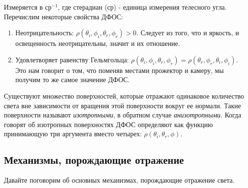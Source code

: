 Измеряется в ср$^{-1}$, где стерадиан (ср) - единица измерения телесного угла. Перечислим некоторые свойства ДФОС:
\begin{enumerate}
  \item Неотрицательность: $\rho(\theta_i,\phi_i,\theta_r,\phi_r)>0$. Следует из того, что и
        яркость, и освещенность неотрицательны, значит и их отношение.
  \item Удовлетворяет равенству Гельмгольца: $\rho(\theta_i,\phi_i,\theta_r,\phi_r)=\rho(\theta_r,\phi_r,\theta_i,\phi_i)$.
        Это нам говорит о том, что поменяв местами прожектор и камеру, мы получим то же самое значение ДФОС.
\end{enumerate}

Существуют множество поверхностей, которые отражают одинаковое количество света
вне зависимости от вращения этой поверхности вокруг ее нормали. Такие
поверхности называют \textit{изотропными}, в обратном случае \textit{анизотропными}.
Когда говорят об изотропных поверхностях ДФОС определяют как функцию принимающую три
аргумента вместо четырех: $\rho(\theta_i,\theta_r,\phi)$.

\subsection{Механизмы, порождающие отражение}

Давайте поговорим об основных механизмах, порождающие отражение света.

